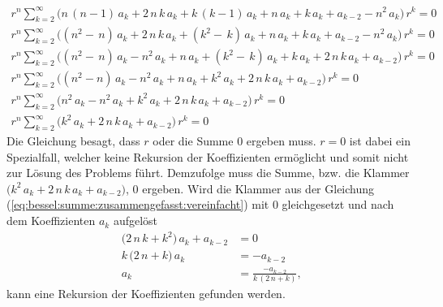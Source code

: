 \begin{align}
	r^n
	\sum_{k=2}^{\infty}
	\biggl(
	n \, \left( n - 1 \right) \, a_k 
	+
	2 \, n \, k \, a_k
	+
	k \, \left( k - 1 \right) \, a_k
	+
	n \, a_k
	+
	k \, a_k
	+
	a_{k - 2}
	-
	n^2 \, a_k
	\biggr)
	\, r^k
	= 0 
	\label{eq:bessel:summe:zusammengefasst}
	\\
	\nonumber
	r^n
	\sum_{k=2}^{\infty}
	\biggl(
	\left( n^2 - \, n \right) \, a_k 
	+
	2 \, n \, k \, a_k
	+
	\left( k^2 - \, k \right) \, a_k
	+
	n \, a_k
	+
	k \, a_k
	+
	a_{k - 2}
	-
	n^2 \, a_k
	\biggr)
	\, r^k
	= 0 
	\\
	\nonumber
	r^n
	\sum_{k=2}^{\infty}
	\biggl(
	\left( n^2 - \, n \right) \, a_k 
	-
	n^2 \, a_k
	+
	n \, a_k
	+
	\left( k^2 - \, k \right) \, a_k
	+
	k \, a_k
	+
	2 \, n \, k \, a_k
	+
	a_{k - 2}
	\biggr)
	\, r^k
	= 0 
	\\
	\nonumber
	r^n
	\sum_{k=2}^{\infty}
	\biggl(
	\left( n^2 - n \right) \, a_k 
	-
	n^2 \, a_k
	+
	n \, a_k
	+
	k^2 \, a_k
	+
	2 \, n \, k \, a_k
	+
	a_{k - 2}
	\biggr)
	\, r^k
	= 0 
	\\
	\nonumber
	r^n
	\sum_{k=2}^{\infty}
	\biggl(
	n^2 \, a_k 
	-
	n^2 \, a_k
	+
	k^2 \, a_k
	+
	2 \, n \, k \, a_k
	+
	a_{k - 2}
	\biggr)
	\, r^k
	= 0 
	\\
	r^n
	\sum_{k=2}^{\infty}
	\biggl(
	k^2 \, a_k
	+
	2 \, n \, k \, a_k
	+
	a_{k - 2}
	\biggr)
	\, r^k
	= 0
	\label{eq:bessel:summe:zusammengefasst:vereinfacht}
\end{align}
Die Gleichung  besagt,
dass $r$ oder die Summe $0$ ergeben muss.
$r = 0$ ist dabei ein Spezialfall, welcher keine Rekursion der Koeffizienten erm\"oglicht und somit nicht zur L\"osung des Problems f\"uhrt.
Demzufolge muss die Summe, bzw. die Klammer $\big( k^2 \, a_k + 2 \, n \, k \, a_k + a_{k - 2} \big)$, $0$ ergeben.
Wird die Klammer
aus der Gleichung (\ref{eq:bessel:summe:zusammengefasst:vereinfacht})
mit $0$ gleichgesetzt
und nach dem Koeffizienten $a_k$ aufgel\"ost
\begin{align}
	\nonumber
	\big(
	2 \, n \, k 
	+
	k^2 
	\big)
	\, a_k
	+
	a_{k - 2}
	&= 0 
	\\
	\nonumber
	k \,
	\big(
	2 \, n
	+
	k
	\big)
	\, a_k
	&= -a_{k - 2}
	\\
	a_k
	&=
	\frac
	{
		-a_{k - 2}
	}{
		k \, \left( 2 \, n + k \right)	
	}
	\label{eq:bessel:koeffizienten:rekursion}
	\text{,}
\end{align}
kann eine Rekursion der Koeffizienten gefunden werden.
